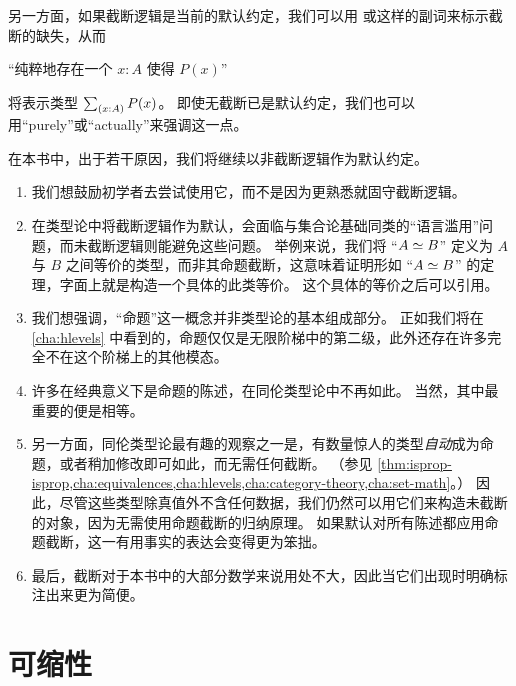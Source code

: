 另一方面，如果截断逻辑是当前的默认约定，我们可以用
%
或这样的副词来标示截断的缺失，从而

\begin{center}
``纯粹地存在一个 $x:A$ 使得 $P(x)$''
\end{center}

将表示类型 $\sm{x:A} P(x)$。
即使无截断已是默认约定，我们也可以用``purely''或``actually''来强调这一点。

在本书中，出于若干原因，我们将继续以非截断逻辑作为默认约定。

\begin{enumerate}[label=(\arabic*)]
\item 我们想鼓励初学者去尝试使用它，而不是因为更熟悉就固守截断逻辑。
\item 在类型论中将截断逻辑作为默认，会面临与集合论基础同类的``语言滥用''问题，而未截断逻辑则能避免这些问题。
  举例来说，我们将 ``$A \simeq B$'' 定义为 $A$ 与 $B$ 之间等价的类型，而非其命题截断，这意味着证明形如 ``$A \simeq B$'' 的定理，字面上就是构造一个具体的此类等价。
  这个具体的等价之后可以引用。
\item 我们想强调，``命题''这一概念并非类型论的基本组成部分。
  正如我们将在 \cref{cha:hlevels} 中看到的，命题仅仅是无限阶梯中的第二级，此外还存在许多完全不在这个阶梯上的其他模态。
\item 许多在经典意义下是命题的陈述，在同伦类型论中不再如此。
  当然，其中最重要的便是相等。
\item 另一方面，同伦类型论最有趣的观察之一是，有数量惊人的类型\emph{自动}成为命题，或者稍加修改即可如此，而无需任何截断。
  （参见 \cref{thm:isprop-isprop,cha:equivalences,cha:hlevels,cha:category-theory,cha:set-math}。）
  因此，尽管这些类型除真值外不含任何数据，我们仍然可以用它们来构造未截断的对象，因为无需使用命题截断的归纳原理。
  如果默认对所有陈述都应用命题截断，这一有用事实的表达会变得更为笨拙。
\item 最后，截断对于本书中的大部分数学来说用处不大，因此当它们出现时明确标注出来更为简便。
\end{enumerate}

%
%

\section{可缩性}
\label{sec:contractibility}

%
%

